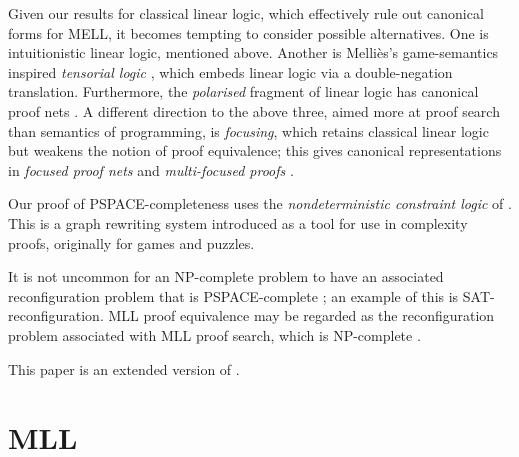 \documentclass{lmcs}
\let\capsabbrev=\uppercase
\begin{document}


Given our results for classical linear logic, which effectively rule out canonical forms for MELL, it becomes tempting to consider possible alternatives. One is intuitionistic linear logic, mentioned above. Another is Melli\`es's game-semantics inspired \emph{tensorial logic} \cite{Mellies-2012}, which embeds linear logic via a double-negation translation. Furthermore, the \emph{polarised} fragment of linear logic has canonical proof nets \cite{Laurent-1999}. A different direction to the above three, aimed more at proof search than semantics of programming, is \emph{focusing}, which retains classical linear logic but weakens the notion of proof equivalence; this gives canonical representations in \emph{focused proof nets} \cite{Andreoli-Maieli-1999} and \emph{multi-focused proofs} \cite{Chaudhuri-Miller-Saurin-2008}.



Our proof of \capsabbrev{pspace}-completeness uses the \emph{nondeterministic constraint logic} of \cite{Hearn-Demaine-2005,Demaine-Hearn-2008,GamesPuzzlesAndComputation}. This is a graph rewriting
system introduced as a tool for use in complexity proofs, originally for games and puzzles.

It is not uncommon for an \capsabbrev{np}-complete problem to have an associated reconfiguration problem that is \capsabbrev{pspace}-complete \cite{ReconfigurationProblems}; an example of this is \capsabbrev{sat}-reconfiguration. \capsabbrev{mll} proof equivalence may be regarded as the reconfiguration problem associated with \capsabbrev{mll} proof search, which is \capsabbrev{np}-complete \cite{Kanovich-1992,Lincoln-Winkler-1994}.


This paper is an extended version of \cite{Heijltjes-Houston-2014}.





\section{\protect\capsabbrev{mll}}
\end{document}
